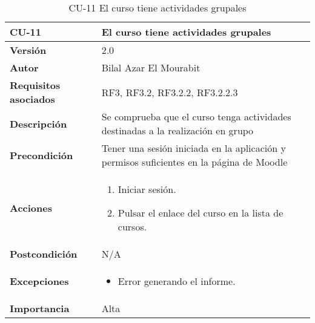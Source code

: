 \begin{table}[H]
	\centering
	\begin{tabularx}{\linewidth}{ p{} p{} }
		\toprule
		\textbf{CU-11}    & \textbf{El curso tiene actividades grupales}\\
		\toprule
		\textbf{Versión}              & 2.0    \\
		\textbf{Autor}                & Bilal Azar El Mourabit \\
		\textbf{Requisitos asociados} & RF3, RF3.2, RF3.2.2, RF3.2.2.3 \\
		\textbf{Descripción}          & Se comprueba que el curso tenga actividades destinadas a la realización en grupo\\
    		\textbf{Precondición}         & Tener una sesión iniciada en la aplicación y permisos suficientes en la página de Moodle \\
		\textbf{Acciones}             & 
		\begin{enumerate}
			\def\labelenumi{\arabic{enumi}.}
			\tightlist
			\item Iniciar sesión.
            \item Pulsar el enlace del curso en la lista de cursos. 
		\end{enumerate}\\
		\textbf{Postcondición}        & N/A \\
		\textbf{Excepciones}          & \begin{itemize}
		    \item Error generando el informe.
		\end{itemize} \\
		\textbf{Importancia}          & Alta \\
		\bottomrule
	\end{tabularx}
	\caption{CU-11 El curso tiene actividades grupales}
\end{table}

